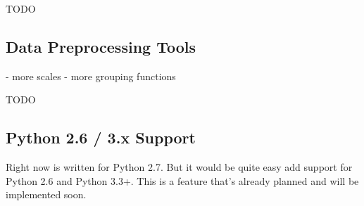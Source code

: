 TODO

\subsection{Data Preprocessing Tools}

- more scales
- more grouping functions

TODO

\subsection{Python 2.6 / 3.x Support}

Right now \tangible{} is written for Python 2.7. But it would be quite easy add
support for Python 2.6 and Python 3.3+. This is a feature that's already planned
and will be implemented soon.


